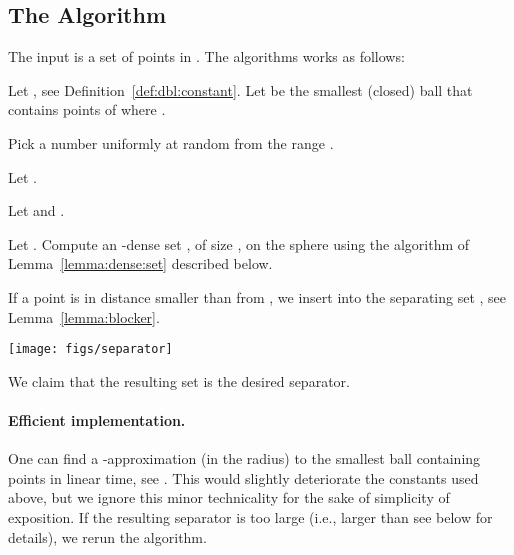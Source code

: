 \InSubmitVer{\documentclass[11pt]{article}}
\numberwithin{figure}{section}
\numberwithin{table}{section}
\numberwithin{equation}{section}
\newcommand{\lemref}[1]{Lemma~\ref{lemma:#1}}
\newcommand{\defref}[1]{Definition~\ref{def:#1}}
\begin{document}
\subsection{The Algorithm}

The input is a set  of  points in . The algorithms
works as follows:

\noindent
\begin{minipage}{0.68\linewidth}
    \begin{compactenum}[\noindent \;\; (A)]
        \item Let , see \defref{dbl:constant}.  Let
         be the smallest (closed) ball that
        contains  points of  where .
        
        \noindent
        \item Pick a number  uniformly at random from the range
        .
        
        \item Let .
        
        \item Let  and .
        
        \item Let .  Compute an -dense
        set , of size , on the sphere 
        using the algorithm of \lemref{dense:set} described below.
        
        
        \item If a point  is in distance smaller
        than  from , we insert
         into the separating set ,
        see \lemref{blocker}.
        
    \end{compactenum}\end{minipage}\hfill \begin{minipage}{0.3\linewidth}
    \centerline{\texttt{[image: figs/separator]}}
\end{minipage}

\medskip

\noindent We claim that the resulting set  is the desired separator.



\paragraph{Efficient implementation.}

One can find a -approximation (in the radius) to the smallest ball
containing  points in linear time, see \cite{h-gaa-11}. This
would slightly deteriorate the constants used above, but we ignore
this minor technicality for the sake of simplicity of exposition. If
the resulting separator is too large (i.e., larger than  see below for details), we rerun the algorithm.
\end{document}
